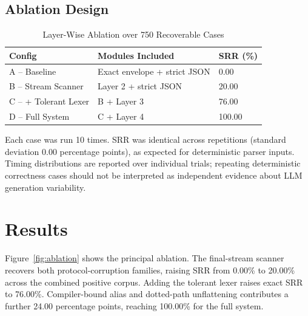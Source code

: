 \documentclass[conference]{IEEEtran}
\begin{document}
\subsection{Ablation Design}

\begin{table}[h]
\centering
\caption{Layer-Wise Ablation over 750 Recoverable Cases}
\begin{tabular}{@{}lll@{}}
\toprule
Config & Modules Included & SRR (\%) \\
\midrule
A -- Baseline & Exact envelope + strict JSON & 0.00 \\
B -- Stream Scanner & Layer 2 + strict JSON & 20.00 \\
C -- + Tolerant Lexer & B + Layer 3 & 76.00 \\
D -- Full System & C + Layer 4 & 100.00 \\
\bottomrule
\end{tabular}
\end{table}

Each case was run 10 times. SRR was identical across repetitions
(standard deviation 0.00 percentage points), as expected for deterministic
parser inputs. Timing distributions are reported over individual trials;
repeating deterministic correctness cases should not be interpreted as
independent evidence about LLM generation variability.

\section{Results}

Figure~\ref{fig:ablation} shows the principal ablation. The final-stream
scanner recovers both protocol-corruption families, raising SRR from
0.00\% to 20.00\% across the combined positive corpus. Adding the tolerant
lexer raises exact SRR to 76.00\%. Compiler-bound alias and dotted-path
unflattening contributes a further 24.00 percentage points, reaching
100.00\% for the full system.
\end{document}
